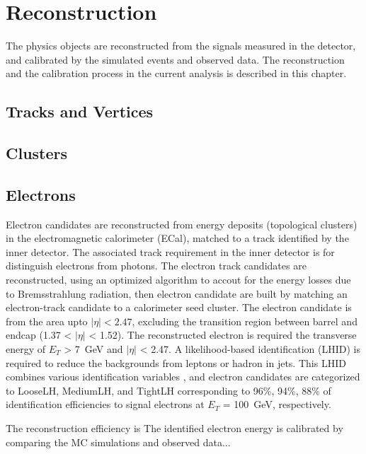 \chapter{Reconstruction}
The physics objects are reconstructed from the signals measured in the detector, and calibrated by the simulated events and observed data. The reconstruction and the calibration process in the current analysis is described in this chapter.


\section{Tracks and Vertices}
\section{Clusters}


\section{Electrons}
Electron candidates are reconstructed from energy deposits (topological clusters) in the electromagnetic calorimeter (ECal), matched to a track identified by the inner detector. 
The associated track requirement in the inner detector is for distinguish electrons from photons. The electron track candidates are reconstructed, using an optimized algorithm to accout for the energy losses due to Bremsstrahlung radiation, then electron candidate are built by matching an electron-track candidate to a calorimeter seed cluster.
The electron candidate is from the area upto $|\eta|<2.47$, excluding the transition region between barrel and endcap (1.37 < $|\eta|$ < 1.52).
The reconstructed electron is required the transverse energy of $E_T$ > 7~GeV and $|\eta|$ < 2.47. A likelihood-based identification (LHID) \cite{} is required to reduce the backgrounds from leptons or hadron in jets. This LHID combines various identification variables \cite{}, and electron candidates are categorized to LooseLH, MediumLH, and TightLH corresponding to 96\%, 94\%, 88\% of identification efficiencies to signal electrons at $E_T$ = 100~GeV, respectively.

The reconstruction efficiency is 
The identified electron energy is calibrated by comparing the MC simulations and observed data...

